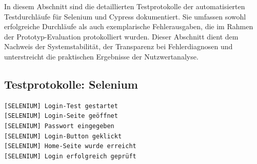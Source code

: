 In diesem Abschnitt sind die detaillierten Testprotokolle der automatisierten Testdurchläufe für Selenium und Cypress dokumentiert. Sie umfassen sowohl erfolgreiche Durchläufe als auch exemplarische Fehlerausgaben, die im Rahmen der Prototyp-Evaluation protokolliert wurden. 
Dieser Abschnitt dient dem Nachweis der Systemstabilität, der Transparenz bei Fehlerdiagnosen und unterstreicht die praktischen Ergebnisse der Nutzwertanalyse.


\subsection{Testprotokolle: Selenium}
\label{subsec:testlogs_selenium}

\begin{lstlisting}[caption={Selenium -- Login (Erfolgreich)}, label={lst:sel_login}, style=logStyle]
[SELENIUM] Login-Test gestartet
[SELENIUM] Login-Seite geöffnet
[SELENIUM] Passwort eingegeben
[SELENIUM] Login-Button geklickt
[SELENIUM] Home-Seite wurde erreicht
[SELENIUM] Login erfolgreich geprüft
\end{lstlisting}

